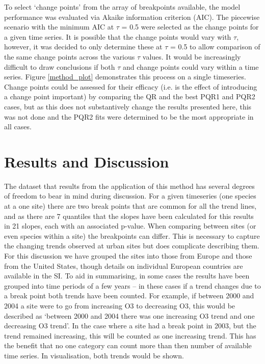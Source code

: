 \documentclass[journal abbreviation, manuscript]{copernicus}
\begin{document}
To select ‘change points’ from the array of breakpoints available, the model performance was evaluated via Akaike information criterion (AIC). The piecewise scenario with the minimum AIC at $\tau$ = 0.5 were selected as the change points for a given time series. It is possible that the change points would vary with $\tau$, however, it was decided to only determine these at $\tau$ = 0.5 to allow comparison of the same change points across the various $\tau$ values. It would be increasingly difficult to draw conclusions if both $\tau$ and change points could vary within a time series.  Figure \ref{method_plot} demonstrates this process on a single timeseries. Change points could be assessed for their efficacy (i.e. is the effect of introducing a change point important) by comparing the QR and the best PQR1 and PQR2 cases, but as this does not substantively change the results presented here, this was not done and the PQR2 fits were determined to be the most appropriate in all cases.

\clearpage
\section{Results and Discussion}
The dataset that results from the application of this method has several degrees of freedom to bear in mind during discussion. For a given timeseries (one species at a one site) there are two break points that are common for all the trend lines, and as there are 7 quantiles that the slopes have been calculated for this results in 21 slopes, each with an associated p-value. When comparing between sites (or even species within a site) the breakpoints can differ. This is necessary to capture the changing trends observed at urban sites but does complicate describing them. For this discussion we have grouped the sites into those from Europe and those from the United States, though details on individual European countries are available in the SI. 
To aid in summarising, in some cases the results have been grouped into time periods of a few years – in these cases if a trend changes due to a break point both trends have been counted. For example, if between 2000 and 2004 a site were to go from increasing O3 to decreasing O3, this would be described as ‘between 2000 and 2004 there was one increasing O3 trend and one decreasing O3 trend’. In the case where a site had a break point in 2003, but the trend remained increasing, this will be counted as one increasing trend. This has the benefit that no one category can count more than then number of available time series. In visualisation, both trends would be shown.
\end{document}
